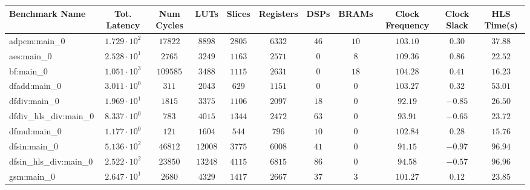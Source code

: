 \begin{tabular}{|l|c|c|c|c|c|c|c|c|c|c|}
\hline
Benchmark Name          & Tot. Latency           & Num Cycles & LUTs      & Slices    & Registers & DSPs    & BRAMs   & Clock Frequency & Clock Slack & HLS Time(s) \\
\hline
adpcm:main\_0           & $ 1.729 \cdot 10^{2} $ & $ 17822  $ & $ 8898  $ & $ 2805  $ & $ 6332  $ & $ 46  $ & $ 10  $ & $ 103.10      $ & $ 0.30    $ & $ 37.88   $ \\
aes:main\_0             & $ 2.528 \cdot 10^{1} $ & $ 2765   $ & $ 3249  $ & $ 1163  $ & $ 2571  $ & $ 0   $ & $ 8   $ & $ 109.36      $ & $ 0.86    $ & $ 22.52   $ \\
bf:main\_0              & $ 1.051 \cdot 10^{3} $ & $ 109585 $ & $ 3488  $ & $ 1115  $ & $ 2631  $ & $ 0   $ & $ 18  $ & $ 104.28      $ & $ 0.41    $ & $ 16.23   $ \\
dfadd:main\_0           & $ 3.011 \cdot 10^{0} $ & $ 311    $ & $ 2043  $ & $ 629   $ & $ 1151  $ & $ 0   $ & $ 0   $ & $ 103.27      $ & $ 0.32    $ & $ 53.01   $ \\
dfdiv:main\_0           & $ 1.969 \cdot 10^{1} $ & $ 1815   $ & $ 3375  $ & $ 1106  $ & $ 2097  $ & $ 18  $ & $ 0   $ & $ 92.19       $ & $ -0.85   $ & $ 26.50   $ \\
dfdiv\_hls\_div:main\_0 & $ 8.337 \cdot 10^{0} $ & $ 783    $ & $ 4015  $ & $ 1344  $ & $ 2472  $ & $ 63  $ & $ 0   $ & $ 93.91       $ & $ -0.65   $ & $ 23.72   $ \\
dfmul:main\_0           & $ 1.177 \cdot 10^{0} $ & $ 121    $ & $ 1604  $ & $ 544   $ & $ 796   $ & $ 10  $ & $ 0   $ & $ 102.84      $ & $ 0.28    $ & $ 15.76   $ \\
dfsin:main\_0           & $ 5.136 \cdot 10^{2} $ & $ 46812  $ & $ 12008 $ & $ 3775  $ & $ 6008  $ & $ 41  $ & $ 0   $ & $ 91.15       $ & $ -0.97   $ & $ 96.94   $ \\
dfsin\_hls\_div:main\_0 & $ 2.522 \cdot 10^{2} $ & $ 23850  $ & $ 13248 $ & $ 4115  $ & $ 6815  $ & $ 86  $ & $ 0   $ & $ 94.58       $ & $ -0.57   $ & $ 96.96   $ \\
gsm:main\_0             & $ 2.647 \cdot 10^{1} $ & $ 2680   $ & $ 4329  $ & $ 1417  $ & $ 2667  $ & $ 37  $ & $ 3   $ & $ 101.27      $ & $ 0.12    $ & $ 23.85   $ \\

\end{tabular}
